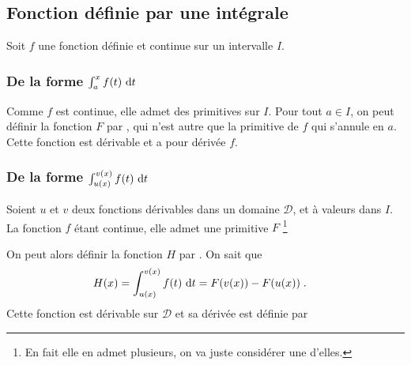       \subsection{Fonction d\'efinie par une int\'egrale}
                  Soit $f$ une fonction d\'efinie et continue sur un intervalle $I$.
            \subsubsection{De la forme $\int_{a}^{x} f(t) ~\mathrm{d}t$}
                  Comme $f$ est continue, elle admet des primitives sur $I$.
                  Pour tout $a \in I$, on peut d\'efinir la fonction $F$ par ,
                  qui n'est autre que la primitive de $f$ qui s'annule en $a$.
                  Cette fonction est d\'erivable et a pour d\'eriv\'ee $f$.
            \subsubsection{De la forme $\int_{u(x)}^{v(x)} f(t) ~\mathrm{d}t$}
                  Soient $u$ et $v$ deux fonctions d\'erivables dans un domaine $\mathcal{D}$, et \`a valeurs dans $I$.
                  La fonction $f$ \'etant continue, elle admet une primitive $F$%
                  \footnote{En fait elle en admet plusieurs, on va juste consid\'erer une d'elles.}
                  
                  On peut alors d\'efinir la fonction $H$ par 
                  .
                  On sait que 
                  \begin{align*}
                        H(x) & = \int_{u(x)}^{v(x)} f(t) ~\mathrm{d}t = F(v(x)) - F(u(x)) \;.
                  \end{align*}
                  Cette fonction est d\'erivable sur $\mathcal{D}$ et sa d\'eriv\'ee est d\'efinie par
                  \begin{center}
                        \thmbox{
                              \[
                                    H'(x) = v'(x) \cdot f(v(x)) - u'(x) \cdot f(u(x)) .
                              \]
                        }
                  \end{center}









\TCDLessonStyleOff
\clearpage
\providecommand{\Oij}{$(O ; \vec{\imath} , \vec{\jmath})$}

